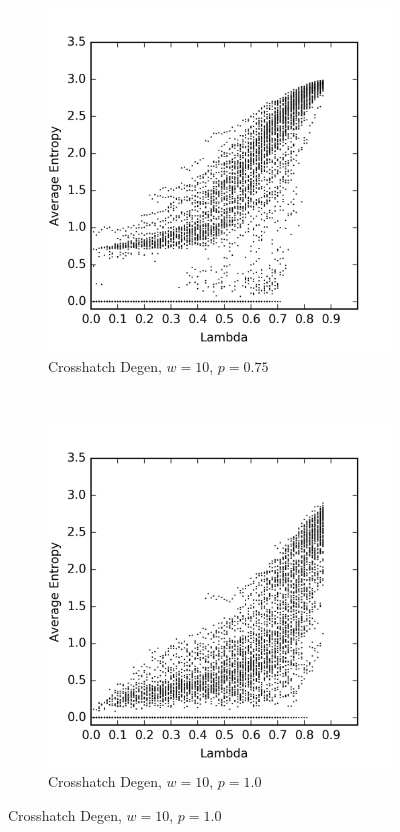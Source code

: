 \documentclass[a4paper,11pt]{article}
\begin{document}
\begin{figure}[htp]
\begin{subfigure}[t]{0.4\textwidth}
  \end{subfigure}

\begin{subfigure}[t]{0.4\textwidth}
  \centering
  \includegraphics[width=\textwidth]{ch6_figs/ch_w10_p75_entropy_scatter}
  \caption{Crosshatch Degen, $w=10$, $p=0.75$}
  \label{fig:lw_w10_p75}
  \end{subfigure}
~
\begin{subfigure}[t]{0.4\textwidth}
  \centering
  \includegraphics[width=\textwidth]{ch6_figs/ch_w10_p100_entropy_scatter}
  \caption{Crosshatch Degen, $w=10$, $p=1.0$}
  \label{fig:lw_w10_p100}
  \end{subfigure}


\end{figure}
\end{document}
